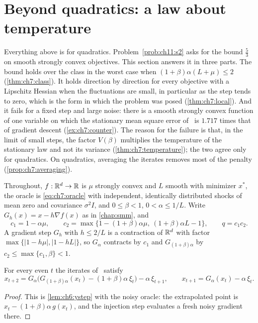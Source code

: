 \section{Beyond quadratics: a law about temperature}\label{sec:ch7:beyond}

Everything above is for quadratics. Problem~\ref{prob:ch11:s2} asks for the bound $\tfrac53$ on smooth strongly convex objectives. This section answers it in three parts. The bound holds over the class in the worst case when $(1+\beta)\alpha(L+\mu)\le2$ (\cref{thm:ch7:class}). It holds direction by direction for every objective with a Lipschitz Hessian when the fluctuations are small, in particular as the step tends to zero, which is the form in which the problem was posed (\cref{thm:ch7:local}). And it fails for a fixed step and large noise: there is a smooth strongly convex function of one variable on which the stationary mean square error of \smmdet\ is $1.717$ times that of gradient descent (\cref{ex:ch7:counter}). The reason for the failure is that, in the limit of small steps, the factor $V(\beta)$ multiplies the temperature of the stationary law and not its variance (\cref{thm:ch7:temperature}); the two agree only for quadratics. On quadratics, averaging the iterates removes most of the penalty (\cref{prop:ch7:averaging}).

Throughout, $f:\mathbb{R}^d\to\mathbb{R}$ is $\mu$ strongly convex and $L$ smooth with minimizer $x^\ast$, the oracle is \eqref{eq:ch7:oracle} with independent, identically distributed shocks of mean zero and covariance $\sigma^2I$, and $0\le\beta<1$, $0<\alpha\le1/L$. Write $G_h(x)=x-h\nabla f(x)$ as in \cref{chap:smm}, and
\[
  c_1=1-\alpha\mu,\qquad c_2=\max\bigl\{1-(1+\beta)\alpha\mu,\ (1+\beta)\alpha L-1\bigr\},\qquad q=c_1c_2 .
\]
A gradient step $G_h$ with $h\le2/L$ is a contraction of $\mathbb{R}^d$ with factor $\max\{|1-h\mu|,|1-hL|\}$, so $G_\alpha$ contracts by $c_1$ and $G_{(1+\beta)\alpha}$ by $c_2\le\max\{c_1,\beta\}<1$.

\begin{lemma}\label{lem:ch7:twostepgen}
For every even $t$ the iterates of \smmdet\ satisfy
\begin{equation}\label{eq:ch7:twostepgen}
  x_{t+2}=G_\alpha\bigl(G_{(1+\beta)\alpha}(x_t)-(1+\beta)\alpha\,\xi_t\bigr)-\alpha\,\xi_{t+1},
  \qquad x_{t+1}=G_\alpha(x_t)-\alpha\,\xi_t .
\end{equation}
\end{lemma}

\begin{proof}
This is \cref{lem:ch6:ystep} with the noisy oracle: the extrapolated point is $x_t-(1+\beta)\alpha\,g(x_t)$, and the injection step evaluates a fresh noisy gradient there.
\end{proof}

